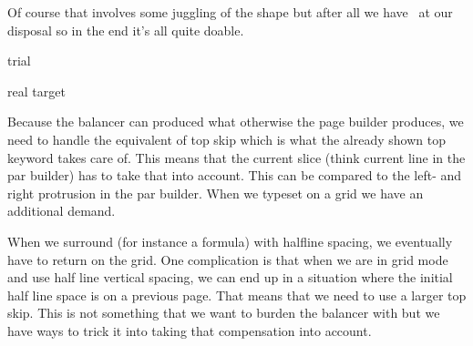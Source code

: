 \startlinecorrection
    \small
\stoplinecorrection

Of course that involves some juggling of the shape but after all we have \LUA\ at
our disposal so in the end it's all quite doable.

\startbuffer[three]
\setbox\scratchboxtwo\vbalance\scratchboxone trial
\stopbuffer

\startbuffer[four]
\global\globalscratchtoks\emptytoks
\localcontrolledendless {%
    \ifvoid\scratchboxtwo
        \expandafter\quitloop
    \else
        \setbox\scratchbox\vbalancedbox\scratchboxtwo
        \xtoksapp\globalscratchtoks {
            \NC \the\currentloopiterator
            \NC \the\ht\scratchbox
            \NC \the\balanceshapevsize\currentloopiterator
            \NC \NR
        }
    \fi
}
\stopbuffer

\start
    \small
\stop

\starttabulate[||||]
\BC \BC real \BC target \NC \NR
\the\globalscratchtoks
\stoptabulate

Because the balancer can produced what otherwise the page builder produces, we
need to handle the equivalent of top skip which is what the already shown \type
{top} keyword takes care of. This means that the current slice (think current
line in the par builder) has to take that into account. This can be compared to the
left- and right protrusion in the par builder. When we typeset on a grid we have an
additional demand.

When we surround (for instance a formula) with halfline spacing, we eventually
have to return on the grid. One complication is that when we are in grid mode and
use half line vertical spacing, we can end up in a situation where the initial
half line space is on a previous page. That means that we need to use a larger
top skip. This is not something that we want to burden the balancer with but we
have ways to trick it into taking that compensation into account.


